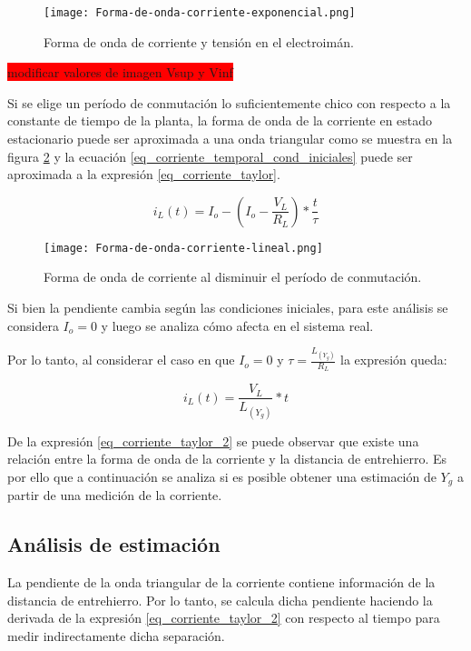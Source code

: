 \begin{figure}[H]
	\centering
	\texttt{[image: Forma-de-onda-corriente-exponencial.png]}
	\caption{Forma de onda de corriente y tensión en el electroimán.}
	\label{fig:img_corriente_exponencial}
\end{figure}

\colorbox{red}{modificar valores de imagen Vsup y Vinf}

Si se elige un período de conmutación lo suficientemente chico con respecto a la constante de tiempo de la planta, la forma de onda de la corriente en estado estacionario puede ser aproximada a una onda triangular como se muestra en la figura \ref{fig:img_corriente_lineal} y la ecuación \ref{eq_corriente_temporal_cond_iniciales} puede ser aproximada a la expresión \ref{eq_corriente_taylor}.

\begin{equation} \label{eq_corriente_taylor}
	i_L(t)=I_o -  (I_o-\frac{V_L}{R_L})*\frac{t}{\tau}
\end{equation}


\begin{figure}[H]
	\centering
	\texttt{[image: Forma-de-onda-corriente-lineal.png]}
	\caption{Forma de onda de corriente al disminuir el período de conmutación.}
	\label{fig:img_corriente_lineal}
\end{figure}

Si bien la pendiente cambia según las condiciones iniciales, para este análisis se considera $I_o=0$ y luego se analiza cómo afecta en el sistema real.

Por lo tanto, al considerar el caso en que $I_o=0$ y  $\tau=\frac{L_{(Y_g)}}{R_L}$ la expresión queda:

\begin{equation} \label{eq_corriente_taylor_2}
	i_L(t)= \frac{V_L}{L_{(Y_g)}}*t
\end{equation}

De la expresión \ref{eq_corriente_taylor_2} se puede observar que existe una relación entre la forma de onda de la corriente y la distancia de entrehierro. Es por ello que a continuación se analiza si es posible obtener una estimación de $Y_g$ a partir de una medición de la corriente.

\subsection{Análisis de estimación}

La pendiente de la onda triangular de la corriente contiene información de la distancia de entrehierro. Por lo tanto, se calcula dicha pendiente haciendo la derivada de la expresión \ref{eq_corriente_taylor_2} con respecto al tiempo para medir indirectamente dicha separación.

